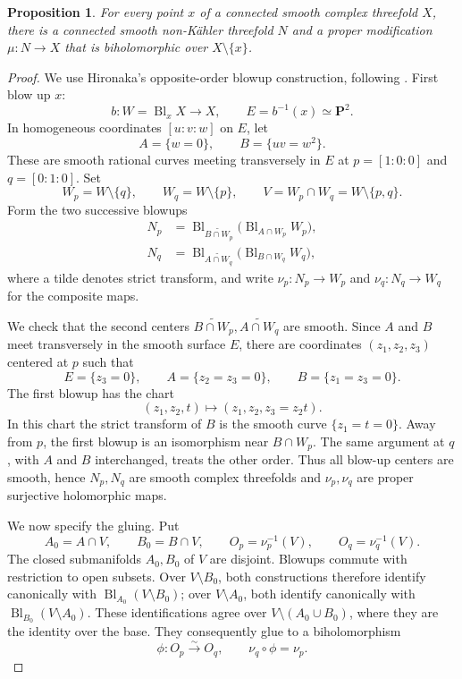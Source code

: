 \documentclass[11pt]{amsart}
\newtheorem{proposition}[theorem]{Proposition}
\theoremstyle{definition}
\theoremstyle{remark}
\numberwithin{equation}{section}
\newcommand{\PP}{\mathbf P}
\newcommand{\Bl}{\operatorname{Bl}}
\begin{document}
\begin{proposition}\label{prop:point-modification}
For every point $x$ of a connected smooth complex threefold $X$,
there is a connected smooth non-K\"ahler threefold $N$ and a proper
modification $\mu:N\to X$ that is biholomorphic over
$X\setminus\{x\}$.
\end{proposition}
\begin{proof}
We use Hironaka's opposite-order blowup construction, following
\cite[\S6]{Barlet2015}. First blow up $x$:
\[
 b:W=\Bl_xX\longrightarrow X,\qquad
 E=b^{-1}(x)\simeq\PP^2.
\]
In homogeneous coordinates $[u:v:w]$ on $E$, let
\[
 A=\{w=0\},\qquad B=\{uv=w^2\}.
\]
These are smooth rational curves meeting transversely in $E$ at
$p=[1:0:0]$ and $q=[0:1:0]$. Set
\[
 W_p=W\setminus\{q\},\qquad
 W_q=W\setminus\{p\},\qquad
 V=W_p\cap W_q=W\setminus\{p,q\}.
\]
Form the two successive blowups
\[
 \begin{aligned}
 N_p&=\Bl_{\widetilde{B\cap W_p}}
          \bigl(\Bl_{A\cap W_p}W_p\bigr),\\
 N_q&=\Bl_{\widetilde{A\cap W_q}}
          \bigl(\Bl_{B\cap W_q}W_q\bigr),
 \end{aligned}
\]
where a tilde denotes strict transform, and write
$\nu_p:N_p\to W_p$ and $\nu_q:N_q\to W_q$ for the composite maps.

We check that the second centers $\widetilde{B\cap W_p}, \widetilde{A\cap W_q}$ are smooth. Since $A$ and $B$
meet transversely in the smooth surface $E$, there are coordinates
$(z_1,z_2,z_3)$ centered at $p$ such that
\[
 E=\{z_3=0\},\qquad
 A=\{z_2=z_3=0\},\qquad
 B=\{z_1=z_3=0\}.
\]
The first blowup has the chart
\[
 (z_1,z_2,t)\longmapsto(z_1,z_2,z_3=z_2t).
\]
In this chart the strict transform of $B$ is the smooth curve
$\{z_1=t=0\}$. Away from $p$, the first blowup is an isomorphism
near $B\cap W_p$. The same argument at $q$, with $A$ and $B$
interchanged, treats the other order. Thus all blow-up centers are smooth,
hence $N_p,N_q$ are smooth complex threefolds and $\nu_p,\nu_q$ are
proper surjective holomorphic maps.

We now specify the gluing. Put
\[
 A_0=A\cap V,\qquad B_0=B\cap V,\qquad
 O_p=\nu_p^{-1}(V),\qquad O_q=\nu_q^{-1}(V).
\]
The closed submanifolds $A_0,B_0$ of $V$ are disjoint.
Blowups commute with restriction to open subsets. Over
$V\setminus B_0$, both constructions therefore identify canonically
with $\Bl_{A_0}(V\setminus B_0)$; over $V\setminus A_0$, both
identify canonically with $\Bl_{B_0}(V\setminus A_0)$.
These identifications agree over $V\setminus(A_0\cup B_0)$,
where they are the identity over the base. They consequently glue
to a biholomorphism
\[
 \phi:O_p\xrightarrow{\sim}O_q,\qquad
 \nu_q\circ\phi=\nu_p.
\]


\end{proof}
\end{document}
